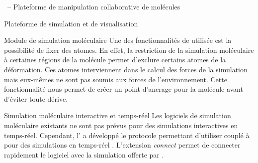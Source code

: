 \documentclass[myfrancais,ngerman,english,frenchb]{mythesis}
\begin{document}
\begin{mychapter}{\myShaddock\ -- Plateforme de manipulation collaborative de molécules}
\begin{mysection}{Plateforme de simulation et de visualisation}
\begin{mysubsection}{Module de simulation moléculaire}
				Une des fonctionnalités de  utilisée est la possibilité de \og fixer \fg des atomes.
				En effet, la restriction de la simulation moléculaire à certaines régions de la molécule permet d'exclure certains atomes de la déformation.
				Ces atomes interviennent dans le calcul des forces de la simulation mais eux-mêmes ne sont pas soumis aux forces de l'environnement.
				Cette fonctionnalité nous permet de créer un point d'ancrage pour la molécule avant d'éviter toute dérive.
				\begin{mysubsubsection}{Simulation moléculaire interactive et temps-réel}
					Les logiciels de simulation moléculaire existants ne sont pas prévus pour des simulations interactives en temps-réel.
					Cependant, l' a développé le protocole  permettant d'utiliser  couplé à  pour des simulations en temps-réel .
					L'extension \textit{ connect} permet de connecter rapidement le logiciel  avec la simulation offerte par .


\end{mysubsubsection}
\end{mysubsection}
\end{mysection}
\end{mychapter}
\end{document}
